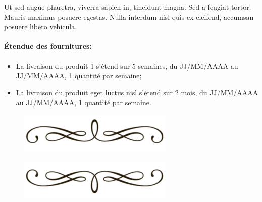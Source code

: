 \documentclass[a4paper,10pt]{article}
\begin{document}
Ut sed augue pharetra, viverra sapien in, tincidunt magna. Sed a feugiat tortor. Mauris maximus posuere egestas. Nulla interdum nisl quis ex eleifend, accumsan posuere libero vehicula. 

\paragraph*{\'{E}tendue des fournitures:}
\begin{itemize}
    \item La livraison du produit 1 s'étend sur 5 semaines, du JJ/MM/AAAA au JJ/MM/AAAA, 1 quantité par semaine;
    \item La livraison du produit eget luctus nisl s'étend sur 2 mois, du JJ/MM/AAAA au JJ/MM/AAAA, 1 quantité par semaine.
\end{itemize}



\rsCredit{}


\begin{figure}[t]
\begin{center}
\includegraphics[scale=0.3]{line_haut.png}
\end{center}
\end{figure}


\begin{figure}[b]
\begin{center}
\includegraphics[scale=0.3]{line_bas.png}
\end{center}
\end{figure}
\end{document}
